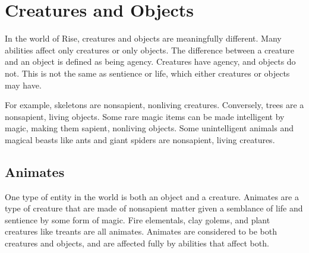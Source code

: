 \section{Creatures and Objects}
    In the world of Rise, creatures and objects are meaningfully different.
    Many abilities affect only creatures or only objects.
    The difference between a creature and an object is defined as being agency.
    Creatures have agency, and objects do not.
    This is not the same as sentience or life, which either creatures or objects may have.

    For example, skeletons are nonsapient, nonliving creatures.
    Conversely, trees are a nonsapient, living objects.
    Some rare magic items can be made intelligent by magic, making them sapient, nonliving objects.
    Some unintelligent animals and magical beasts like ants and giant spiders are nonsapient, living creatures.

    \subsection{Animates}
        One type of entity in the world is both an object and a creature.
        Animates are a type of creature that are made of nonsapient matter given a semblance of life and sentience by some form of magic.
        Fire elementals, clay golems, and plant creatures like treants are all animates.
        Animates are considered to be both creatures and objects, and are affected fully by abilities that affect both.
